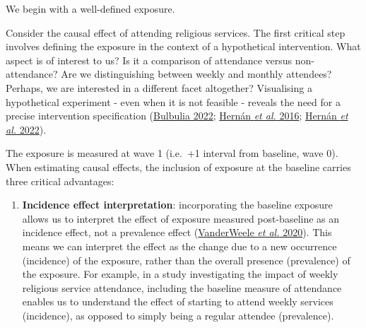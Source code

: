 \documentclass[
  singlecolumn]{article}
\providecommand{\tightlist}{%
  \setlength{\itemsep}{0pt}\setlength{\parskip}{0pt}}\usepackage{longtable,booktabs,array}
\begin{document}
We begin with a well-defined exposure.

Consider the causal effect of attending religious services. The first
critical step involves defining the exposure in the context of a
hypothetical intervention. What aspect is of interest to us? Is it a
comparison of attendance versus non-attendance? Are we distinguishing
between weekly and monthly attendees? Perhaps, we are interested in a
different facet altogether? Visualising a hypothetical experiment - even
when it is not feasible - reveals the need for a precise intervention
specification (\protect\hyperlink{ref-bulbulia2022}{Bulbulia 2022};
\protect\hyperlink{ref-hernuxe1n2016a}{Hernán \emph{et al.} 2016};
\protect\hyperlink{ref-hernuxe1n2022}{Hernán \emph{et al.} 2022}).

The exposure is measured at wave 1 (i.e.~+1 interval from baseline, wave
0). When estimating causal effects, the inclusion of exposure at the
baseline carries three critical advantages:

\begin{enumerate}
\def\labelenumi{\alph{enumi}.}
\tightlist
\item
  \textbf{Incidence effect interpretation}: incorporating the baseline
  exposure allows us to interpret the effect of exposure measured
  post-baseline as an incidence effect, not a prevalence effect
  (\protect\hyperlink{ref-vanderweele2020}{VanderWeele \emph{et al.}
  2020}). This means we can interpret the effect as the change due to a
  new occurrence (incidence) of the exposure, rather than the overall
  presence (prevalence) of the exposure. For example, in a study
  investigating the impact of weekly religious service attendance,
  including the baseline measure of attendance enables us to understand
  the effect of starting to attend weekly services (incidence), as
  opposed to simply being a regular attendee (prevalence).
\end{enumerate}
\end{document}

